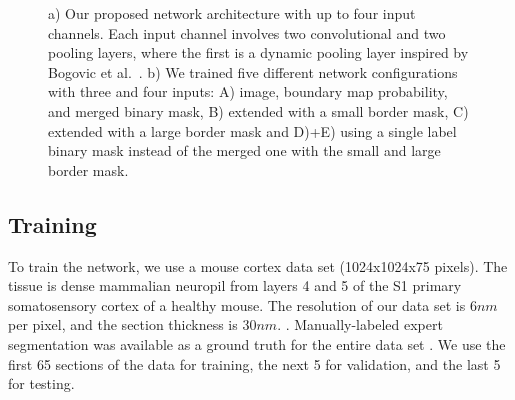 \begin{figure}[t]
 \centering
    \hfill
	\caption{a) Our proposed network architecture with up to four input channels. Each input channel involves two convolutional and two pooling layers, where the first is a dynamic pooling layer inspired by Bogovic et al.~\cite{BogovicHJ13}. b) We trained five different network configurations with three and four inputs: A) image, boundary map probability, and merged binary mask, B) extended with a small border mask, C) extended with a large border mask and D)+E) using a single label binary mask instead of the merged one with the small and large border mask.}
\end{figure}
%  


\subsection{Training}
To train the network, we use a mouse cortex data set (1024x1024x75 pixels). The tissue is dense mammalian neuropil from layers 4 and 5 of the S1 primary somatosensory cortex of a healthy mouse. The resolution of our data set is $6nm$ per pixel, and the section thickness is $30nm$. . Manually-labeled expert segmentation was available as a ground truth for the entire data set . We use the first 65 sections of the data for training, the next 5 for validation, and the last 5 for testing.
%

